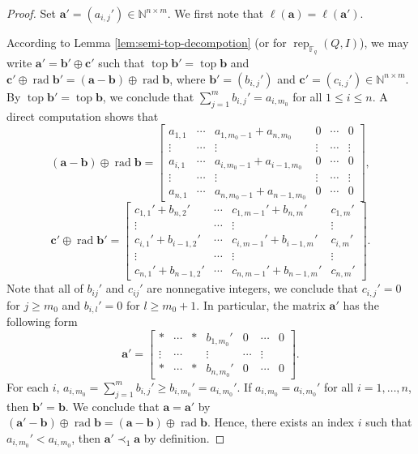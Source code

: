 \documentclass[12pt]{amsart}
\theoremstyle{remark}
\theoremstyle{definition}
\numberwithin{equation}{section}
\begin{document}
\begin{proof}
 
    
    Set $\mathbf{a}'=(a_{i,j}')\in \mathbb{N}^{n\times m}$.
We first note that $\ell(\mathbf{a})=\ell(\mathbf{a}')$. 

According to Lemma \ref{lem:semi-top-decompotion} (or \cite[Lemma 3.1]{G95} for $\operatorname{rep}_{\mathbb{F}_q}(Q,I)$), we may write $\mathbf{a}'=\mathbf{b}'\oplus \mathbf{c}'$ such that $\operatorname{top}\mathbf{b}'=\operatorname{top}\mathbf{b}$ and $\mathbf{c}'\oplus \operatorname{rad} \mathbf{b}'=(\mathbf{a}-\mathbf{b})\oplus \operatorname{rad} \mathbf{b}$, where $\mathbf{b}'=(b_{i,j}')$ and $\mathbf{c}'=(c_{i,j}')\in \mathbb{N}^{n\times m}$. By $\operatorname{top}\mathbf{b}'=\operatorname{top}\mathbf{b}$, we conclude that $\sum_{j=1}^mb_{i,j}'
=a_{i,m_0}$ for all $1\leq i\leq n$.
  A direct computation shows that 
\[
(\mathbf{a}-\mathbf{b})\oplus \operatorname{rad}\mathbf{b}=\begin{bmatrix}
    a_{1,1}&\cdots &a_{1,m_0-1}+a_{n,m_0}&0&\cdots &0\\
    \vdots &\cdots&\vdots&\vdots&\cdots &\vdots\\
    a_{i,1}&\cdots &a_{i,m_0-1}+a_{i-1,m_0}&0&\cdots&0\\
    \vdots &\cdots&\vdots&\vdots&\cdots &\vdots\\
    a_{n,1}&\cdots&a_{n,m_0-1}+a_{n-1,m_0}&0&\cdots&0
\end{bmatrix},
\]
\[
\mathbf{c}'\oplus \operatorname{rad}\mathbf{b}'=\begin{bmatrix}
    c_{1,1}'+b_{n,2}'&\cdots&c_{1,m-1}'+b_{n,m}'&c_{1,m}'\\
    \vdots&\cdots&\vdots&\vdots\\
    c_{i,1}'+b_{i-1,2}'&\cdots&c_{i,m-1}'+b_{i-1,m}'&c_{i,m}'\\
    \vdots&\cdots&\vdots&\vdots\\
    c_{n,1}'+b_{n-1,2}'&\cdots&c_{n,m-1}'+b_{n-1,m}'&c_{n,m}'
\end{bmatrix}.
\]
Note that all of $b_{ij}'$ and $c_{ij}'$ are nonnegative integers, we conclude that $c_{i,j}'=0$ for $j\geq m_0$ and $b_{i,l}'=0$ for $l\geq m_0+1$. In particular, the matrix $\mathbf{a}'$ has the following form
\[
\mathbf{a}'=\begin{bmatrix}
    \ast&\cdots &\ast& b_{1,m_0}'&0&\cdots &0\\
\vdots&\cdots&&\vdots&\cdots&\vdots\\
\ast&\cdots&\ast&b_{n,m_0}'&0&\cdots&0
\end{bmatrix}.
\]
For each $i$, $a_{i,m_0}=\sum_{j=1}^mb_{i,j}'\geq b_{i,m_0}'=a_{i,m_0}'$. If $a_{i,m_0}=a_{i,m_0}'$ for all $i=1,\ldots, n$, then $\mathbf{b}'=\mathbf{b}$. We conclude that $\mathbf{a}=\mathbf{a}'$ by 
 $(\mathbf{a}'-\mathbf{b})\oplus \operatorname{rad}\mathbf{b}=(\mathbf{a}-\mathbf{b})\oplus \operatorname{rad}\mathbf{b}$. 
Hence,  there exists an index $i$ such that $a_{i,m_0}'<a_{i,m_0}$, then $\mathbf{a}'\prec_1\mathbf{a}$ by definition. 
\end{proof}
\end{document}

